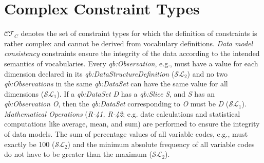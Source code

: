 \documentclass{llncs}
\begin{document}
{\section{Complex Constraint Types}
\label{complex-constraint-types}


$\mathcal{CT}_{C}$ denotes the set of constraint types for which the definition of constraints is rather complex and cannot be derived from vocabulary definitions.
\emph{Data model consistency} constraints ensure the integrity of
the data according to the intended semantics of vocabularies.
Every \emph{qb:Observation}, e.g., must have a value for each dimension
declared in its \emph{qb:DataStructureDefinition} ($\mathcal{SL}_{2}$)
and no two \emph{qb:Observations} in the same \emph{qb:DataSet}
can have the same value for all dimensions ($\mathcal{SL}_{1}$).
If a \emph{qb:DataSet} \emph{D} has a \emph{qb:Slice} \emph{S}, and \emph{S} has an
\emph{qb:Observation} \emph{O}, then the \emph{qb:DataSet} corresponding to \emph{O} must be \emph{D} ($\mathcal{SL}_{1}$).
{\em Mathematical Operations} (\emph{R-41, R-42}; e.g. date calculations and statistical computations like average, mean, and sum) are performed to ensure the integrity of data models.
The sum of percentage values of all variable codes, e.g., must exactly be 100 ($\mathcal{SL}_{2}$)
and the minimum absolute frequency of all variable codes do not have to be greater than the maximum ($\mathcal{SL}_{2}$).


}
\end{document}
